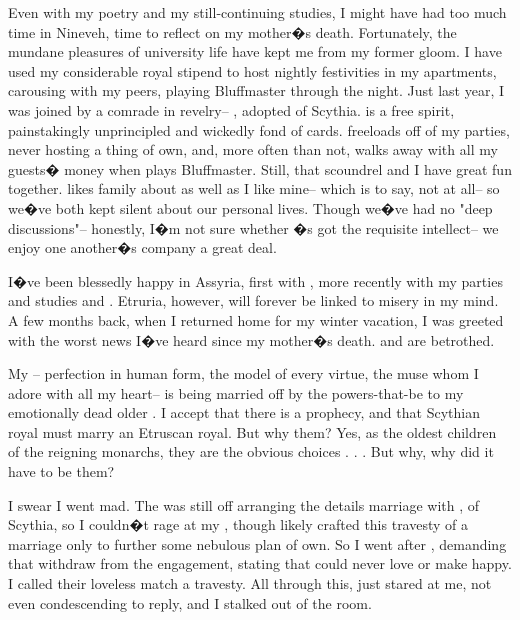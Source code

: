 \documentclass[char]{Kos}
\begin{document}
Even with my poetry and my still-continuing studies, I might have had too much time in Nineveh, time to reflect on my mother�s death. Fortunately, the mundane pleasures of university life have kept me from my former gloom. I have used my considerable royal stipend to host nightly festivities in my apartments, carousing with my peers, playing Bluffmaster through the night. Just last year, I was joined by a comrade in revelry-- \cWard{}, adopted \cWard{\prince} of Scythia. \cWard{\nickname} is a free spirit, painstakingly unprincipled and wickedly fond of cards. \cWard{\They} freeloads off of my parties, never hosting a thing of \cWard{\their} own, and, more often than not, \cWard{\they} walks away with all my guests� money when \cWard{\they} plays Bluffmaster. Still, that scoundrel and I have great fun together. \cWard{\nickname} likes \cWard{\their} family about as well as I like mine-- which is to say, not at all-- so we�ve both kept silent about our personal lives. Though we�ve had no "deep discussions"-- honestly, I�m not sure whether \cWard{\they}�s got the requisite intellect-- we enjoy one another�s company a great deal.

I�ve been blessedly happy in Assyria, first with \cBride{\nickname}, more recently with my parties and studies and \cWard{\nickname}. Etruria, however, will forever be linked to misery in my mind. A few months back, when I returned home for my winter vacation, I was greeted with the worst news I�ve heard since my mother�s death. \cBride{\nickname} and \cGroom{\nickname} are betrothed.

My \cBride{\nickname}-- perfection in human form, the model of every virtue, the muse whom I adore with all my heart-- is being married off by the powers-that-be to my emotionally dead older \cGroom{\sibling}. I accept that there is a prophecy, and that Scythian royal must marry an Etruscan royal. But why them? Yes, as the oldest children of the reigning monarchs, they are the obvious choices . . . But why, why did it have to be them? 

I swear I went mad. The \cEtruriaKing{\monarch} was still off arranging the details marriage with \cScythiaKing{}, \cScythiaKing{\monarch} of Scythia, so I couldn�t rage at my \cEtruriaKing{\parent}, though \cEtruriaKing{\they} likely crafted this travesty of a marriage only to further some nebulous plan of \cScythiaKing{\their} own. So I went after \cGroom{\nickname}, demanding that \cGroom{\they} withdraw from the engagement, stating that \cGroom{\they} could never love \cBride{\nickname} or make \cBride{\them} happy. I called their loveless match a travesty. All through this, \cGroom{\they} just stared at me, not even condescending to reply, and I stalked out of the room.
\end{document}
